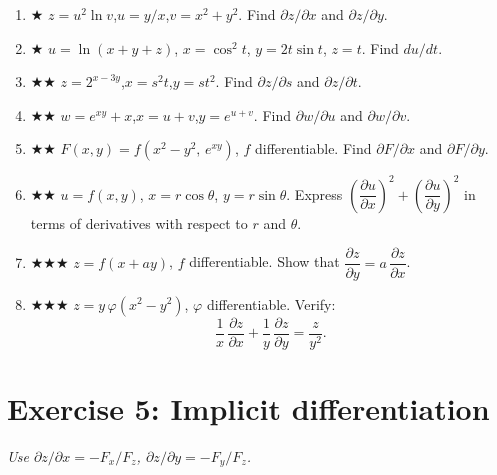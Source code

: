 \documentclass[12pt,a4paper]{article}
\newcommand{\easy}{{\color{green!60!black}$\bigstar$}}
\newcommand{\medium}{{\color{orange}$\bigstar\bigstar$}}
\newcommand{\hard}{{\color{red}$\bigstar\bigstar\bigstar$}}
\begin{document}
\begin{enumerate}[leftmargin=*, label=(\alph*)]

\item \easy\quad
$z = u^2\ln v$,\quad $u=y/x$,\quad $v=x^2+y^2$.
Find $\partial z/\partial x$ and $\partial z/\partial y$.

\item \easy\quad
$u=\ln(x+y+z)$,\; $x=\cos^2 t$,\; $y=2t\sin t$,\; $z=t$.
Find $du/dt$.

\item \medium\quad
$z=2^{x-3y}$,\quad $x=s^2 t$,\quad $y=st^2$.
Find $\partial z/\partial s$ and $\partial z/\partial t$.

\item \medium\quad
$w = e^{xy}+x$,\quad $x=u+v$,\quad $y=e^{u+v}$.
Find $\partial w/\partial u$ and $\partial w/\partial v$.

\item \medium\quad
$F(x,y) = f(x^2-y^2,\, e^{xy})$, $f$ differentiable.
Find $\partial F/\partial x$ and $\partial F/\partial y$.

\item \medium\quad
$u = f(x,y)$, $x = r\cos\theta$, $y = r\sin\theta$.
Express $\left(\dfrac{\partial u}{\partial x}\right)^2+\left(\dfrac{\partial u}{\partial y}\right)^2$
in terms of derivatives with respect to $r$ and $\theta$.

\item \hard\quad
$z=f(x+ay)$, $f$ differentiable.
Show that $\dfrac{\partial z}{\partial y}=a\,\dfrac{\partial z}{\partial x}$.

\item \hard\quad
$z = y\,\varphi(x^2-y^2)$, $\varphi$ differentiable. Verify:
\[
  \frac{1}{x}\,\frac{\partial z}{\partial x}+\frac{1}{y}\,\frac{\partial z}{\partial y}=\frac{z}{y^2}.
\]

\end{enumerate}

\section*{Exercise 5: Implicit differentiation}

\emph{Use $\partial z/\partial x = -F_x/F_z$, $\partial z/\partial y = -F_y/F_z$.}
\end{document}
